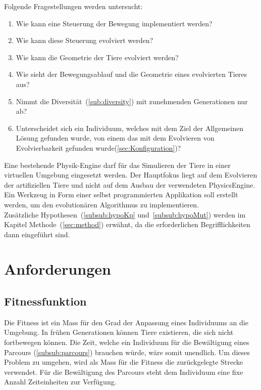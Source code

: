     Folgende Fragestellungen werden untersucht:
    \begin{enumerate}
      \item \label{item:frageSteuerungBeine} Wie kann eine Steuerung der Bewegung implementiert werden?
      \item Wie kann diese Steuerung evolviert werden?
      \item Wie kann die Geometrie der Tiere evolviert werden?
      \item Wie sieht der Bewegungsablauf und die Geometrie eines evolvierten Tieres aus?
      \item Nimmt die Diversität~(\vref{sub:diversity}) mit zunehmenden Generationen nur ab?
      \item Unterscheidet sich ein Individuum, welches mit dem Ziel der Allgemeinen Lösung gefunden wurde,
            von einem das mit dem Evolvieren von Evolvierbarkeit gefunden wurde(\vref{sec:Konfiguration})?

    \end{enumerate}
    Eine bestehende Physik-Engine darf für das Simulieren der Tiere in einer virtuellen Umgebung eingesetzt werden.
    Der Hauptfokus liegt auf dem Evolvieren der artifiziellen Tiere und nicht auf dem Ausbau der verwendeten \gls{PhysicsEngine}.
    Ein Werkzeug in Form einer selbst programmierten Applikation soll erstellt werden, um den evolutionären Algorithmus zu implementieren. \\

    Zusätzliche Hypothesen~(\vref{subsub:hypoKp} und~\vref{subsub:hypoMut}) werden im Kapitel Methode~(\vref{sec:method}) erwähnt,
    da die erforderlichen Begrifflichkeiten dann eingeführt sind.


  \section{Anforderungen}

    \subsection{Fitnessfunktion}

      Die Fitness ist ein Mass für den Grad der Anpassung eines Individuums an die Umgebung.
      In frühen Generationen können Tiere existieren, die sich nicht fortbewegen können.
      Die Zeit, welche ein Individuum für die Bewältigung eines Parcours (\vref{subsub:parcours}) brauchen würde,
      wäre somit unendlich.
      Um dieses Problem zu umgehen, wird als Mass für die Fitness die zurückgelegte Strecke verwendet.
      Für die Bewältigung des Parcours steht dem Individuum eine fixe Anzahl Zeiteinheiten zur Verfügung.

